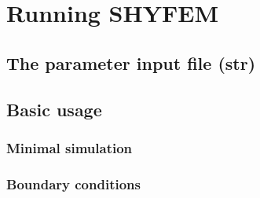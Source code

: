 \documentclass{report}
\newcommand{\todo}[1]{This section still has to be written by #1}
\begin{document}

\chapter{Running SHYFEM}

	

	\section{The parameter input file (str)}
	



	\section{Basic usage}

		

		\subsection{Minimal simulation}
		


		\subsection{Boundary conditions}
		


\end{document}
